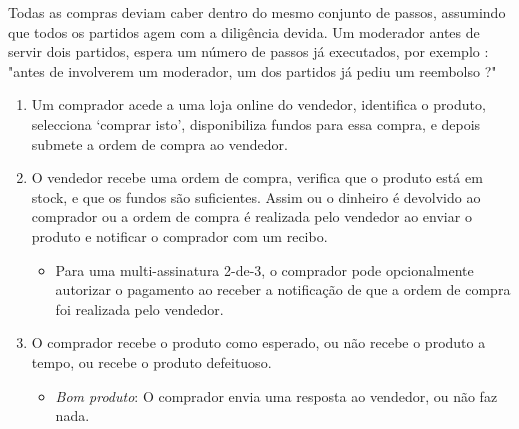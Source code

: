 Todas as compras deviam caber dentro do mesmo conjunto de passos, assumindo que todos os partidos agem com a diligência devida. Um moderador antes de servir dois partidos, espera um número de passos já executados, por exemplo : "antes de involverem um moderador, um dos partidos já pediu um reembolso ?" 
\begin{enumerate}
    \item Um comprador acede a uma loja online do vendedor, identifica o produto, selecciona `comprar isto', disponibiliza fundos para essa compra, e depois submete a ordem de compra ao vendedor.
    \item O vendedor recebe uma ordem de compra, verifica que o produto está em stock, e que os fundos são suficientes. Assim ou o dinheiro é devolvido ao comprador ou a ordem de compra é realizada pelo vendedor ao enviar o produto e notificar o comprador com um recibo.  
    \begin{itemize}
        \item Para uma multi-assinatura 2-de-3, o comprador pode opcionalmente autorizar o pagamento ao receber a notificação de que a ordem de compra foi realizada  pelo vendedor.
    \end{itemize}{}
    \item O comprador recebe o produto como esperado, ou não recebe o produto a tempo, ou recebe o produto defeituoso.
    \begin{itemize}
        \item {\em Bom produto}: O comprador envia uma resposta ao vendedor, ou não faz nada. 
        \begin{itemize}

\end{itemize}
\end{itemize}
\end{enumerate}
